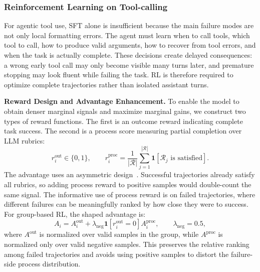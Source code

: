
\subsubsection{Reinforcement Learning on Tool-calling}
For agentic tool use, SFT alone is insufficient because the main failure modes are not only local formatting errors. The agent must learn when to call tools, which tool to call, how to produce valid arguments, how to recover from tool errors, and when the task is actually complete. These decisions create delayed consequences: a wrong early tool call may only become visible many turns later, and premature stopping may look fluent while failing the task. RL is therefore required to optimize complete trajectories rather than isolated assistant turns.

\textbf{Reward Design and Advantage Enhancement.} To enable the model to obtain denser marginal signals and maximize marginal gains, we construct two types of reward functions. The first is an outcome reward indicating complete task success. The second is a process score measuring partial completion over LLM rubrics:
\begin{equation}
r_i^{\mathrm{out}} \in \{0,1\},
\qquad
r_i^{\mathrm{proc}}
=
\frac{1}{|\mathcal{R}|}
\sum_{j=1}^{|\mathcal{R}|}
\mathbf{1}[\mathcal{R}_j \text{ is satisfied}].
\end{equation}
The advantage uses an asymmetric design~\citep{tan2026papostabilizingrubricintegration}. Successful trajectories already satisfy all rubrics, so adding process reward to positive samples would double-count the same signal. The informative use of process reward is on failed trajectories, where different failures can be meaningfully ranked by how close they were to success. For group-based RL, the shaped advantage is: 
\begin{equation}
A_i
=
A_i^{\mathrm{out}}
+
\lambda_{\mathrm{neg}}
\mathbf{1}[r_i^{\mathrm{out}}=0]
A_i^{\mathrm{proc}},
\qquad
\lambda_{\mathrm{neg}}=0.5,
\end{equation}
where $A^{\mathrm{out}}$ is normalized over valid samples in the group, while $A^{\mathrm{proc}}$ is normalized only over valid negative samples. This preserves the relative ranking among failed trajectories and avoids using positive samples to distort the failure-side process distribution.

